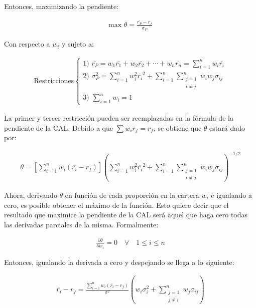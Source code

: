 Entonces, maximizando la pendiente:

\begin{align}
	\mbox{max } \theta = \frac{\overline{r_P} - r_f}{\sigma_P} \label{maxptecal}
\end{align}

Con respecto a $w_i$ y sujeto a:

\begin{align}
\mbox{Restricciones} \left\{  \nonumber
	\begin{array}{l}
		\mbox{1) } \overline{r_P} = w_1 \overline{r_1} + w_2 \overline{r_2} + \dotsb + 
			w_n \overline{r_n} = \sum\limits_{i=1}^n w_i \overline{r_i} \nonumber\\
		\mbox{2) } \sigma_P^2 = \sum\limits_{i=1}^n w_i^2 \overline{r_i}^2 + 
			\sum\limits_{i=1}^n \sum\limits_{\substack{j=1 \\ i \neq j}}^n w_i w_j \sigma_{ij}  \nonumber \\
		\mbox{3) } \sum\limits_{i=1}^n w_i = 1
	\end{array} \right.
\end{align}

La primer y tercer restricción pueden ser reemplazadas en la fórmula de la pendiente de la CAL. Debido a que $\sum w_i r_f = r_f$, se obtiene que $\theta$ estará dado por:

\begin{align}
	\theta = \left[ \sum\limits_{i=1}^n w_i (\overline{r_i} - r_f) \right] 
		\left( \sum\limits_{i=1}^n w_i^2 \overline{r_i}^2 + \sum\limits_{i=1}^n 
		\sum\limits_{\substack{j=1 \\ i \neq j}}^n w_i w_j \sigma_{ij} \right)^{-1/2}
\end{align}

Ahora, derivando $\theta$ en función de cada proporción en la cartera $w_i$ e igualando a cero, es posible obtener el máximo de la función. Esto quiere decir que el resultado que maximice la pendiente de la CAL será aquel que haga cero todas las derivadas parciales de la misma. Formalmente:

\begin{align}
	\frac{\partial \theta}{\partial w_i} = 0 \quad \forall \quad 1 \leq i \leq n
\end{align}

Entonces, igualando la derivada a cero y despejando se llega a lo siguiente:

\begin{align}
	\overline{r_i} - r_f = \frac{\sum\limits_{i=1}^n w_i (\overline{r_i} - r_f)}{\sigma^2} 
		\left( w_i \sigma_i^2 + \sum\limits_{\substack{j=1 \\ j \neq i}}^n w_j \sigma_{ij} \right) \label{eqzetas1}
\end{align}


